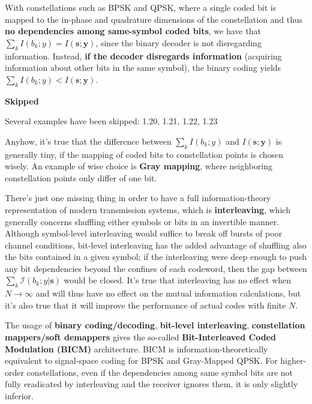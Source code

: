 \documentclass[a4paper, 11pt]{book}
\begin{document}
With constellations such as BPSK and QPSK, where a single coded bit is mapped to the in-phase and quadrature dimensions of the constellation and thus \textbf{no dependencies among same-symbol coded bits}, we have that $\sum_k I(b_k; y) = I(\bm{s}; \bm{y})$, since the binary decoder is not disregarding information.
Instead, \textbf{if the decoder disregards information} (acquiring information about other bits in the same symbol), the binary coding yields $\sum_k I(b_k; y) < I(\bm{s}; \bm{y})$.

\begin{tcolorbox}[sharp corners, boxrule=0pt, leftrule=2pt, colframe=gray!60!black, colback=gray!10, left=5pt, top=3pt, bottom=3pt]
    \textbf{Skipped}
    
    Several examples have been skipped: 1.20, 1.21, 1.22, 1.23
\end{tcolorbox}

\vspace{0.5em}

Anyhow, it's true that the difference between $\sum_k I(b_k; y)$ and $I(\bm{s}; \bm{y})$ is generally tiny, if the mapping of coded bits to constellation points is chosen wisely. An example of wise choice is \textbf{Gray mapping}, where neighboring constellation points only differ of one bit.

\vspace{1em}

There's just one missing thing in order to have a full information-theory representation of modern transmission systems, which is \textbf{interleaving}, which generally concerns shuffling either symbols or bits in an invertible manner.
Although symbol-level interleaving would suffice to break off bursts of poor channel conditions, bit-level interleaving has the added advantage of shuffling also the bits contained in a given symbol; if the interleaving were deep enough to push any bit dependencies beyond the confines of each codeword, then the gap between $\sum_k \mathcal{I}(b_k; y|\bm{s})$ would be closed.
It's true that interleaving has no effect when $N \to \infty$ and will thus have no effect on the mutual information calculations, but it's also true that it will improve the performance of actual codes with finite $N$.

The usage of \textbf{binary coding/decoding}, \textbf{bit-level interleaving}, \textbf{constellation mappers/soft demappers} gives the so-called \textbf{Bit-Interleaved Coded Modulation (BICM)} architecture.
BICM is information-theoretically equivalent to signal-space coding for BPSK and Gray-Mapped QPSK. For higher-order constellations, even if the dependencies among same symbol bits are not fully eradicated by interleaving and the receiver ignores them, it is only slightly inferior.
\end{document}
